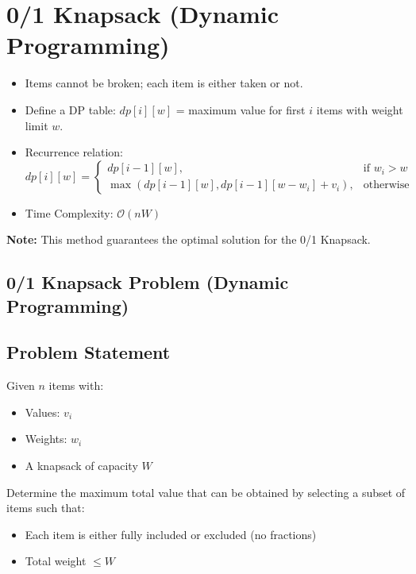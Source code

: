 \documentclass[14pt]{extarticle}
\begin{document}
\newpage
\section{0/1 Knapsack (Dynamic Programming)}

\begin{itemize}[label=\textbullet]
    \item Items cannot be broken; each item is either taken or not.
    \item Define a DP table: $dp[i][w]$ = maximum value for first $i$ items with weight limit $w$.
    \item Recurrence relation:
    \[
        dp[i][w] =
        \begin{cases}
            dp[i-1][w], & \text{if } w_i > w \\
            \max(dp[i-1][w], dp[i-1][w - w_i] + v_i), & \text{otherwise}
        \end{cases}
    \]
    \item Time Complexity: $\mathcal{O}(nW)$
\end{itemize}

\textbf{Note:} This method guarantees the optimal solution for the 0/1 Knapsack.


\subsection{0/1 Knapsack Problem (Dynamic Programming)}

\subsection*{Problem Statement}

Given $n$ items with:
\begin{itemize}
    \item Values: $v_i$
    \item Weights: $w_i$
    \item A knapsack of capacity $W$
\end{itemize}

Determine the maximum total value that can be obtained by selecting a subset of items such that:
\begin{itemize}
    \item Each item is either fully included or excluded (no fractions)
    \item Total weight $\leq W$
\end{itemize}
\end{document}
